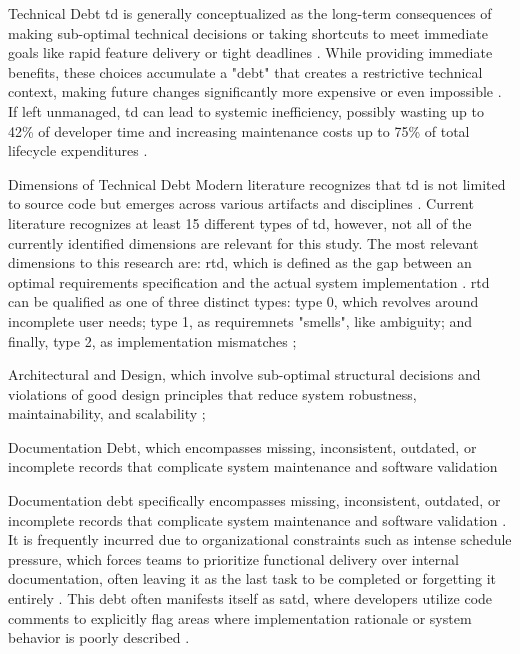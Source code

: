 \documentclass[12pt,reqno, twoside]{amsbook}
\makeatletter
\def\section{\@startsection{section}{1}%
      \z@{.5\linespacing\@plus.7\linespacing}{.25\linespacing}%
      {\normalfont\bfseries\flushleft}}
\def\subsection{\@startsection{subsection}{2}%
      \z@{.5\linespacing\@plus.7\linespacing}{.25\linespacing}%
      {\normalfont\bfseries\flushleft}}
\theoremstyle{plain}
\numberwithin{equation}{chapter}
\numberwithin{section}{chapter}
\makeatother
\begin{document}
\section{Technical Debt}
\gls{td} is generally conceptualized as the long-term consequences of making sub-optimal technical decisions or taking shortcuts 
to meet immediate goals like rapid feature delivery or tight deadlines \parencite{Alenazi2025, Besker2019, Wattanakriengkrai2018}. 
While providing immediate benefits, these choices accumulate a "debt" that creates a restrictive technical context, making future 
changes significantly more expensive or even impossible \parencite{Besker2019}. If left unmanaged, \gls{td} can lead to systemic 
inefficiency, possibly wasting up to 42\% of developer time and increasing maintenance costs up to 75\% of total lifecycle 
expenditures \parencite{Alfayez2018, Arvanitou2019}. 


\subsection{Dimensions of Technical Debt}
Modern literature recognizes that \gls{td} is not limited to source code but emerges across various artifacts and disciplines 
\parencite{Alenazi2025, Lenarduzzi2019}. Current literature recognizes at least 15 different types of \gls{td}, however, not 
all of the currently identified dimensions are relevant for this study. The most relevant dimensions to this research are:
    \gls{rtd}, which is defined as the gap between an optimal requirements specification and the actual system implementation 
        \parencite{Alenazi2025}. \gls{rtd} can be qualified as one of three distinct types: type 0, which revolves around incomplete 
        user needs; type 1, as requiremnets "smells", like ambiguity; and finally, type 2, as implementation mismatches 
        \parencite{Alenazi2025, Lenarduzzi2019};

    Architectural and Design, which involve sub-optimal structural decisions and violations of good design principles that 
    reduce system robustness, maintainability, and scalability \parencite{Li2025};

    Documentation Debt, which encompasses missing, inconsistent, outdated, or incomplete records that complicate system maintenance 
    and software validation \parencite{Farias2020, Rios2020, Li2025}

    Documentation debt specifically encompasses missing, inconsistent, outdated, or incomplete records that complicate system 
    maintenance and software validation \parencite{Alenazi2025, Alfayez2018}. It is frequently incurred due to organizational 
    constraints such as intense schedule pressure, which forces teams to prioritize functional delivery over internal documentation, 
    often leaving it as the last task to be completed or forgetting it entirely \parencite{Alenazi2025, Alfayez2018}. This debt 
    often manifests itself as \gls{satd}, where developers utilize code comments to explicitly flag areas where implementation 
    rationale or system behavior is poorly described \parencite{Alenazi2025}.
\end{document}
